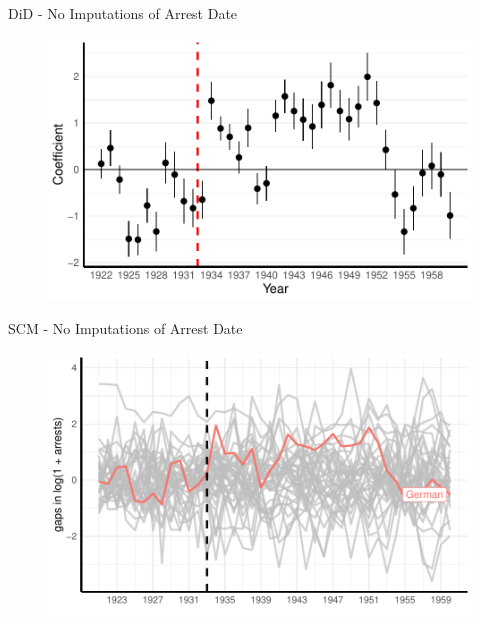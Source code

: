 \documentclass[11pt]{beamer}
\begin{document}
\begin{frame}[label=did_no_date_imputation]{DiD - No Imputations of Arrest Date}
 \begin{figure}[h]
\centering
\includegraphics[width=1\textwidth]{pr_cr2_fmla_pred_full_no_trends_geopol.pdf}
\end{figure}
\hyperlink{add_content}{}
\end{frame}

\begin{frame}[label=sc_no_date_imputation]{SCM - No Imputations of Arrest Date}
 \begin{figure}[h]
\centering
\includegraphics[width=1\textwidth]{placebo_highlight_all_no_date_imputation.pdf}
\end{figure}
\hyperlink{add_content}{}
\end{frame}
\end{document}
